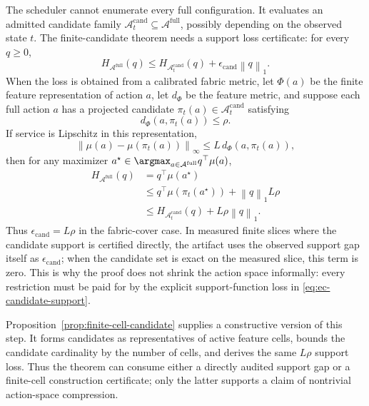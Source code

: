\documentclass[opre,dblanonrev]{informs4}
\newcommand{\Afull}{\mathcal A^{\mathrm{full}}}
\newcommand{\Acand}{\mathcal A^{\mathrm{cand}}}
\newcommand{\normone}[1]{\left\|#1\right\|_1}
\newcommand{\norminf}[1]{\left\|#1\right\|_\infty}
\begin{document}
The scheduler cannot enumerate every full configuration.  It evaluates an
admitted candidate family \(\Acand_t\subseteq\Afull\), possibly depending on
the observed state \(t\).  The finite-candidate theorem needs a support loss
certificate: for every \(q\ge0\),
\begin{equation}
  \label{eq:ec-candidate-support}
  H_{\Afull}(q)\le H_{\Acand_t}(q)
  +\epsilon_{\mathrm{cand}}\normone{q}.
\end{equation}
When the loss is obtained from a calibrated fabric metric, let
\(\Phi(a)\) be the finite feature representation of action \(a\), let
\(d_{\Phi}\) be the feature metric, and suppose each full action \(a\) has a projected
candidate \(\pi_t(a)\in\Acand_t\) satisfying
\begin{equation}
  d_{\Phi}(a,\pi_t(a))\le\rho.
\end{equation}
If service is Lipschitz in this representation,
\begin{equation}
  \norminf{\mu(a)-\mu(\pi_t(a))}\le L\,d_{\Phi}(a,\pi_t(a)),
\end{equation}
then for any maximizer \(a^\star\in\argmax_{a\in\Afull}q^\top \mu(a)\),
\begin{equation}
  \begin{aligned}
  H_{\Afull}(q)
  &=q^\top \mu(a^\star)\\
  &\le q^\top \mu(\pi_t(a^\star))+\normone{q}L\rho\\
  &\le H_{\Acand_t}(q)+L\rho\normone{q}.
  \end{aligned}
\end{equation}
Thus \(\epsilon_{\mathrm{cand}}=L\rho\) in the fabric-cover case.  In measured
finite slices where the candidate support is certified directly, the artifact
uses the observed support gap itself as \(\epsilon_{\mathrm{cand}}\); when the
candidate set is exact on the measured slice, this term is zero.  This is why
the proof does not shrink the action space informally: every restriction must
be paid for by the explicit support-function loss in
\eqref{eq:ec-candidate-support}.

Proposition~\ref{prop:finite-cell-candidate} supplies a constructive version of
this step.  It forms candidates as representatives of active feature cells,
bounds the candidate cardinality by the number of cells, and derives the same
\(L\rho\) support loss.  Thus the theorem can consume either a directly audited
support gap or a finite-cell construction certificate; only the latter supports
a claim of nontrivial action-space compression.
\end{document}
